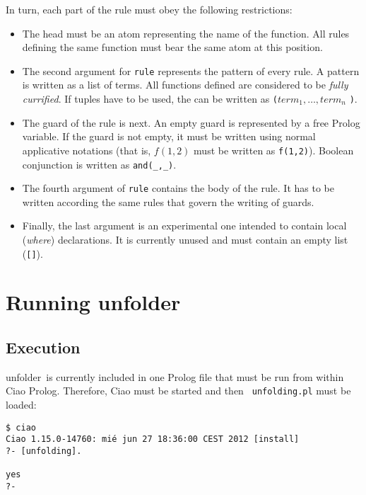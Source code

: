 \documentclass[11pt,a4paper,twoside,openright]{book}
\newcommand{\unfolder}{{\textsf{unfolder~}}}
\begin{document}
\noindent
In turn, each part of the rule must obey the following restrictions:

\begin{itemize}
\item
The head must be an atom representing the name of the function. All
rules defining the same function must bear the same atom at this
position.

\item
The second argument for {\tt rule} represents the pattern of every
rule. A pattern is written as a list of terms. All functions defined
are considered to be {\em fully currified}. If tuples have to be used,
the can be written as \verb.(.$\mathit{term}_1,\ldots,\mathit{term}_n$
\verb.)..

\item
The guard of the rule is next. An empty guard is represented by a free
Prolog variable. If the guard is not empty, it must be written using
normal applicative notations (that is, $f(1,2)$ must be written as
{\tt f(1,2)}). Boolean conjunction is written as {\tt and(\_,\_)}.

\item
The fourth argument of {\tt rule} contains the body of the rule. It
has to be written according the same rules that govern the writing of
guards.

\item
Finally, the last argument is an experimental one intended to contain
local ({\em where}) declarations. It is currently unused and must
contain an empty list (\verb.[].).
\end{itemize}

\chapter{Running \unfolder}
\label{chap_running}

\section{Execution}

\unfolder is currently included in one Prolog file that must be run
from within Ciao Prolog. Therefore, Ciao must be started and then {\tt
  unfolding.pl} must be loaded:

\begin{verbatim}
$ ciao
Ciao 1.15.0-14760: mié jun 27 18:36:00 CEST 2012 [install]
?- [unfolding].

yes
?-
\end{verbatim}
\end{document}
